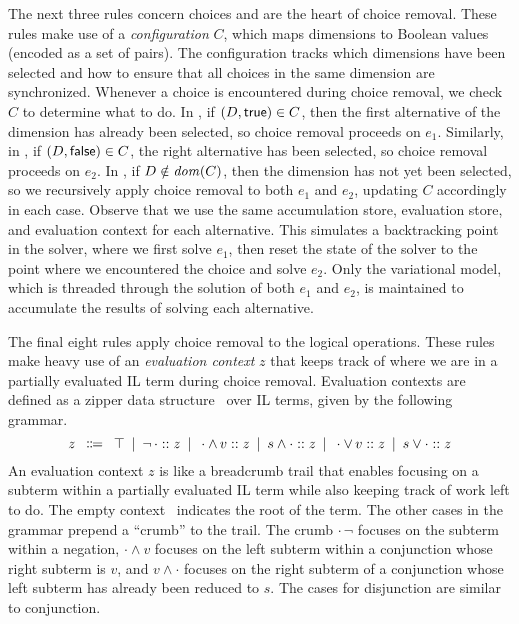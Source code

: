 The next three rules concern choices and are the heart of choice removal.
%
These rules make use of a \emph{configuration} $C$, which maps dimensions to
Boolean values (encoded as a set of pairs). The configuration tracks which
dimensions have been selected and how to ensure that all choices in the same
dimension are synchronized.
%
Whenever a choice  is encountered during choice removal, we
check $C$ to determine what to do.
%
In \crChcT, if $(D,\true)\in C$, then the first alternative of the dimension
has already been selected, so choice removal proceeds on $e_1$. Similarly, in
\crChcF, if $(D,\false)\in C$, the right alternative has been selected, so
choice removal proceeds on $e_2$.
%
In \crChc, if $D\notin\dom{C}$, then the dimension has not yet been selected,
so we recursively apply choice removal to both $e_1$ and $e_2$, updating $C$
accordingly in each case. Observe that we use the same accumulation store,
evaluation store, and evaluation context for each alternative. This simulates a
backtracking point in the solver, where we first solve $e_1$, then reset the
state of the solver to the point where we encountered the choice and solve
$e_2$. Only the variational model, which is threaded through the solution of
both $e_1$ and $e_2$, is maintained to accumulate the results of solving each
alternative.


The final eight rules apply choice removal to the logical operations.
%
These rules make heavy use of an \emph{evaluation context} $z$ that keeps track
of where we are in a partially evaluated IL term during choice removal.
Evaluation contexts are defined as a zipper data structure~\cite{huet_1997}
over IL terms, given by the following grammar.
%
\[
  z \hquad\Coloneqq\hquad \inRoot
  \hquad|\hquad \inNot{z}
  \hquad|\hquad \inAndL{z}{\,v}
  \hquad|\hquad \inAndR{s}{z}
  \hquad|\hquad \inOrL{z}{\,v}
  \hquad|\hquad \inOrR{s}{z}
\]
%
An evaluation context $z$ is like a breadcrumb trail that enables focusing on a
subterm within a partially evaluated IL term while also keeping track of work
left to do.
%
The empty context \inRoot\ indicates the root of the term. The other cases in
the grammar prepend a ``crumb'' to the trail. The crumb $\cdot\,\neg$ focuses
on the subterm within a negation, $\cdot\wedge v$ focuses on the left subterm
within a conjunction whose right subterm is $v$, and $v\wedge\cdot$ focuses on
the right subterm of a conjunction whose left subterm has already been reduced
to $s$. The cases for disjunction are similar to conjunction.



